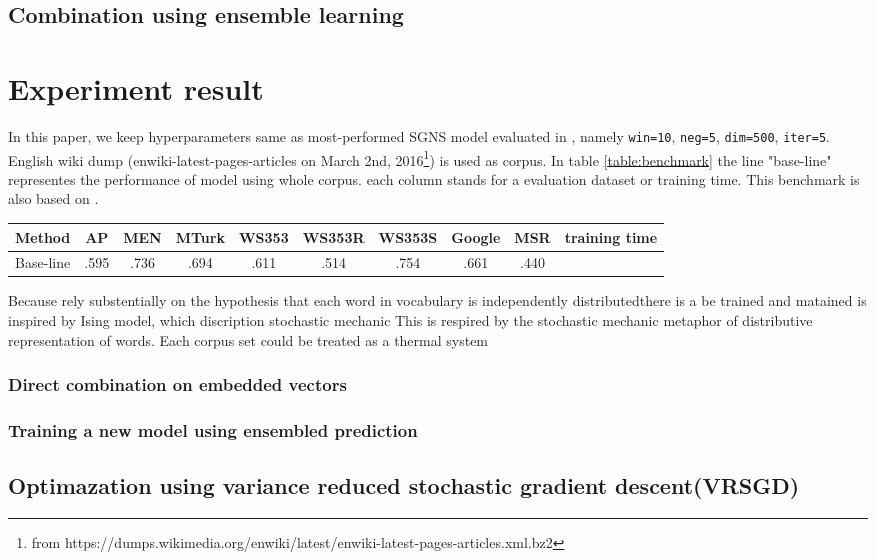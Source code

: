 \documentclass[11pt,a4paper]{article}
\begin{document}
  \subsection{Combination using ensemble learning}

\section{Experiment result}
In this paper, we keep hyperparameters same as most-performed SGNS model evaluated in \cite{levy2015improving}, namely \verb|win=10|, \verb|neg=5|, \verb|dim=500|, \verb|iter=5|. English wiki dump (enwiki-latest-pages-articles on March 2nd, 2016\footnote{from https://dumps.wikimedia.org/enwiki/latest/enwiki-latest-pages-articles.xml.bz2}) is used as corpus. In table \ref{table:benchmark} the line "base-line" representes the performance of model using whole corpus. each column stands for a evaluation dataset or training time. This benchmark is also based on \cite{levy2015improving}.
\begin{table*}
\caption{Performance and training time of different scalable strategies}
\begin{tabular}{c|cccccccc|c}
\hline
Method    & AP   & MEN  & MTurk & WS353 & WS353R & WS353S & Google & MSR  & training time\\ \hline
Base-line & .595 & .736 & .694  & .611  & .514   & .754   & .661   & .440 & \\ \hline
\end{tabular}
\label{table:benchmark}
\end{table*}

Because  rely substentially on the hypothesis that each word in vocabulary is independently distributedthere is a be trained and matained is inspired by Ising model, which discription stochastic mechanic This is respired by the stochastic mechanic metaphor of distributive representation of words. Each corpus set could be treated as a thermal system 
\subsubsection{Direct combination on embedded vectors}
\subsubsection{Training a new model using ensembled prediction}

\subsection{Optimazation using variance reduced stochastic gradient descent(VRSGD)}
\end{document}
